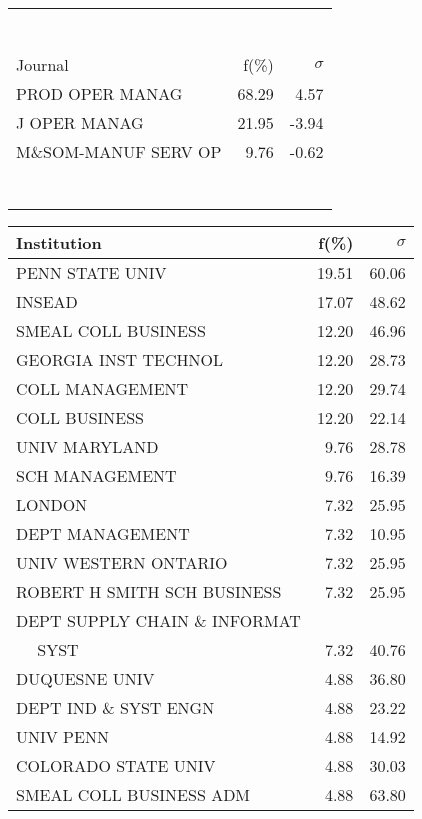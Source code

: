 \documentclass[a4paper,11pt]{report}
\begin{document}
\begin{landscape}
\begin{table}[!ht]
{\begin{tabular}{|l r r|}
 &  & \\
 &  & \\
 &  & \\
 &  & \\
 &  & \\
 &  & \\
 &  & \\
\hline
\hline
Journal & f(\%) & $\sigma$\\
\hline
PROD OPER MANAG & 68.29 & 4.57\\
J OPER MANAG & 21.95 & -3.94\\
M\&SOM-MANUF SERV OP & 9.76 & -0.62\\
 &  & \\
 &  & \\
 &  & \\
 &  & \\
 &  & \\
 &  & \\
 &  & \\
\hline
\end{tabular}
}
{\scriptsize\begin{tabular}{|l r r|}
\hline
Institution & f(\%) & $\sigma$\\
\hline
PENN STATE UNIV & 19.51 & 60.06\\
INSEAD & 17.07 & 48.62\\
SMEAL COLL BUSINESS & 12.20 & 46.96\\
GEORGIA INST TECHNOL & 12.20 & 28.73\\
COLL MANAGEMENT & 12.20 & 29.74\\
COLL BUSINESS & 12.20 & 22.14\\
UNIV MARYLAND & 9.76 & 28.78\\
SCH MANAGEMENT & 9.76 & 16.39\\
LONDON & 7.32 & 25.95\\
DEPT MANAGEMENT & 7.32 & 10.95\\
UNIV WESTERN ONTARIO & 7.32 & 25.95\\
ROBERT H SMITH SCH BUSINESS & 7.32 & 25.95\\
DEPT SUPPLY CHAIN \& INFORMAT &  & \\
$\quad$ SYST & 7.32 & 40.76\\
DUQUESNE UNIV & 4.88 & 36.80\\
DEPT IND \& SYST ENGN & 4.88 & 23.22\\
UNIV PENN & 4.88 & 14.92\\
COLORADO STATE UNIV & 4.88 & 30.03\\
SMEAL COLL BUSINESS ADM & 4.88 & 63.80\\

\end{tabular}}
\end{table}
\end{landscape}
\end{document}
